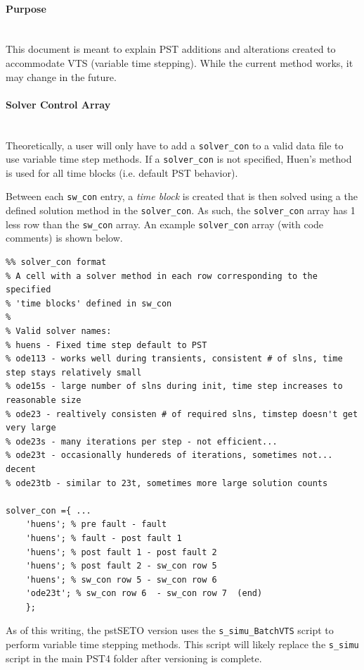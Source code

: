 \documentclass[12pt]{article}
\begin{document}
\onehalfspacing
\paragraph{Purpose} \ \\
This document is meant to explain PST additions and alterations created to accommodate VTS (variable time stepping).
While the current method works, it may change in the future.

\paragraph{Solver Control Array} \ \\
Theoretically, a user will only have to add a \verb|solver_con| to a valid data file to use variable time step methods.
If a \verb|solver_con| is not specified, Huen's method is used for all time blocks (i.e. default PST behavior).

Between each \verb|sw_con| entry, a \emph{time block} is created that is then solved using a the defined solution method in the \verb|solver_con|.
As such, the \verb|solver_con| array has 1 less row than the \verb|sw_con| array.
An example \verb|solver_con| array (with code comments) is shown below.
\begin{verbatim}
%% solver_con format
% A cell with a solver method in each row corresponding to the specified
% 'time blocks' defined in sw_con
%
% Valid solver names:
% huens - Fixed time step default to PST
% ode113 - works well during transients, consistent # of slns, time step stays relatively small
% ode15s - large number of slns during init, time step increases to reasonable size
% ode23 - realtively consisten # of required slns, timstep doesn't get very large
% ode23s - many iterations per step - not efficient...
% ode23t - occasionally hundereds of iterations, sometimes not... decent
% ode23tb - similar to 23t, sometimes more large solution counts

solver_con ={ ...
    'huens'; % pre fault - fault
    'huens'; % fault - post fault 1
    'huens'; % post fault 1 - post fault 2
    'huens'; % post fault 2 - sw_con row 5
    'huens'; % sw_con row 5 - sw_con row 6 
    'ode23t'; % sw_con row 6  - sw_con row 7  (end)
    };
\end{verbatim}

As of this writing, the pstSETO version uses the \verb|s_simu_BatchVTS| script to perform variable time stepping methods.
This script will likely replace the \verb|s_simu| script in the main PST4 folder after versioning is complete.\\
\end{document}
